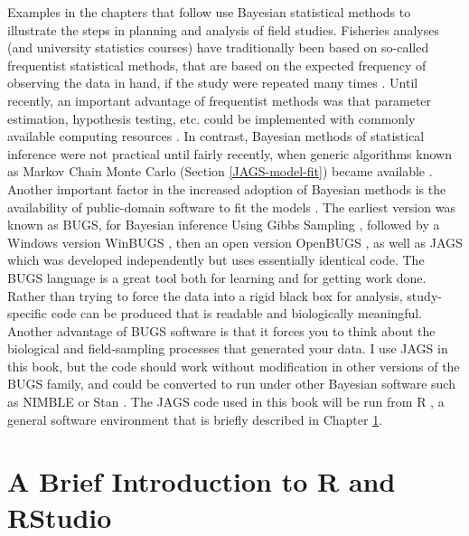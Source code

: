 \documentclass[
]{krantz}
\begin{document}
Examples in the chapters that follow use Bayesian statistical methods to illustrate the steps in planning and analysis of field studies. Fisheries analyses (and university statistics courses) have traditionally been based on so-called frequentist statistical methods, that are based on the expected frequency of observing the data in hand, if the study were repeated many times \citep{mccarthy_2007}. Until recently, an important advantage of frequentist methods was that parameter estimation, hypothesis testing, etc. could be implemented with commonly available computing resources \citep{dorazio_2016}. In contrast, Bayesian methods of statistical inference were not practical until fairly recently, when generic algorithms known as Markov Chain Monte Carlo (Section \ref{JAGS-model-fit}) became available \citep{dorazio_2016}. Another important factor in the increased adoption of Bayesian methods is the availability of public-domain software to fit the models \citep{kéry.schaub_2012}. The earliest version was known as BUGS, for Bayesian inference Using Gibbs Sampling \citep{lunn.etal2009}, followed by a Windows version WinBUGS \citep{lunn.etal2000}, then an open version OpenBUGS \citep{lunn.etal2009}, as well as JAGS \citep{plummer2003} which was developed independently but uses essentially identical code. The BUGS language is a great tool both for learning and for getting work done. Rather than trying to force the data into a rigid black box for analysis, study-specific code can be produced that is readable and biologically meaningful. Another advantage of BUGS software is that it forces you to think about the biological and field-sampling processes that generated your data. I use JAGS in this book, but the code should work without modification in other versions of the BUGS family, and could be converted to run under other Bayesian software such as NIMBLE \citep{devalpine.etal_2017} or Stan \citep{gelman.etal_2015}. The JAGS code used in this book will be run from R \citep{R-base}, a general software environment that is briefly described in Chapter \ref{R-intro}.

\hypertarget{R-intro}{%
\chapter{A Brief Introduction to R and RStudio}\label{R-intro}}
\end{document}
